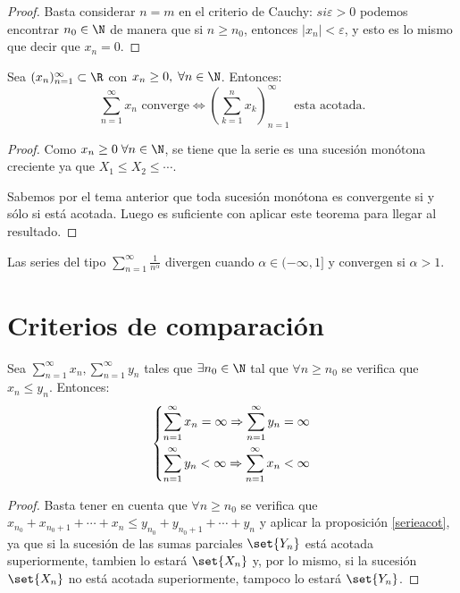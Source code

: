\begin{proof}
	Basta considerar \(n = m \) en el criterio de Cauchy: \(si \varepsilon > 0 \) podemos encontrar \(n_0 \in \N\) de manera que si \(n \geq n_0\), entonces \(\left\vert x_n  \right\vert < \varepsilon\), y esto es lo mismo que decir que \(x_n = 0\).     
\end{proof}
\begin{proposition}
	Sea \((x_n)^{\infty}_{n=1} \subset \R \) con \(x_n \geq 0, \; \forall n \in \N \). Entonces:
	\[
		\sum_{n =1}^{\infty} x_n \text{ converge} \iff (\sum_{k =1}^{n } x_k )^{\infty}_{n=1} \text{ esta acotada}.
	\]
\end{proposition}
\begin{proof}
	Como \(x_n \geq 0 \; \forall n \in \N\), se tiene que la serie es una sucesión monótona creciente ya que \(X_1 \leq X_2 \leq \cdots \). 
	
	Sabemos por el tema anterior que toda sucesión monótona es convergente si y sólo si está acotada. Luego es suficiente con aplicar este teorema para llegar al resultado. 
\end{proof}

\begin{proposition}
	\label{serieacot}
	Las series del tipo \(\sum_{n =1}^{\infty} \frac{1}{n^{\alpha} } \) divergen cuando \(\alpha \in (-\infty, 1] \) y convergen si \(\alpha > 1 \).
\end{proposition}

\section{Criterios de comparación}
\begin{theorem}
	Sea \(\sum\nolimits_{n =1}^{\infty} x_n, \sum\nolimits_{n =1}^{\infty} y_n \) tales que \(\exists n_0 \in \N \) tal que \(\forall n \geq n_0 \) se verifica que \(x_n \leq y_n \). Entonces:
	\[
		\begin{dcases}
			\sum_{n =1}^{\infty} x_n = \infty \Rightarrow \sum_{n =1}^{\infty} y_n = \infty \\
			\sum_{n =1}^{\infty} y_n < \infty \Rightarrow \sum_{n =1}^{\infty} x_n < \infty
		\end{dcases}
	\]
\end{theorem}
\begin{proof}
	Basta tener en cuenta que \(\forall n \geq n_0\) se verifica que \(x_{n_0} + x_{n_0 + 1} + \cdots + x_n \leq y_{n_0} + y_{n_{0} +1} + \cdots + y_n  \) y aplicar la proposición \ref{serieacot}, ya que si la sucesión de las sumas parciales \(\set{Y_n }\) está acotada superiormente, tambien lo estará \(\set{X_n }\) y, por lo mismo, si la sucesión \(\set{X_n }\) no está acotada superiormente, tampoco lo estará \(\set{Y_n }\).
\end{proof}

